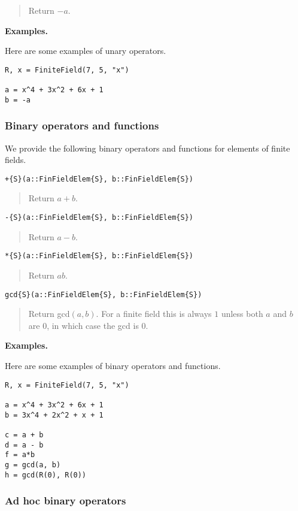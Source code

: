 \documentclass[a4paper,10pt]{article}
\newcommand{\desc}[1]{\vspace{-3mm}\begin{quote}#1\end{quote}}
\begin{document}
{{\desc{Return $-a$.}

\textbf{Examples.}

Here are some examples of unary operators.

\begin{lstlisting}
R, x = FiniteField(7, 5, "x")

a = x^4 + 3x^2 + 6x + 1
b = -a
\end{lstlisting}

\subsubsection{Binary operators and functions}

We provide the following binary operators and functions for elements of
finite fields.

\begin{lstlisting}
+{S}(a::FinFieldElem{S}, b::FinFieldElem{S})
\end{lstlisting}

\desc{Return $a + b$.}

\begin{lstlisting}
-{S}(a::FinFieldElem{S}, b::FinFieldElem{S})
\end{lstlisting}

\desc{Return $a - b$.}

\begin{lstlisting}
*{S}(a::FinFieldElem{S}, b::FinFieldElem{S})
\end{lstlisting}

\desc{Return $ab$.}

\begin{lstlisting}
gcd{S}(a::FinFieldElem{S}, b::FinFieldElem{S})
\end{lstlisting}

\desc{Return gcd$(a, b)$. For a finite field this is always $1$ unless both
$a$ and $b$ are $0$, in which case the gcd is $0$.}

\textbf{Examples.}

Here are some examples of binary operators and functions.

\begin{lstlisting}
R, x = FiniteField(7, 5, "x")

a = x^4 + 3x^2 + 6x + 1
b = 3x^4 + 2x^2 + x + 1

c = a + b
d = a - b
f = a*b
g = gcd(a, b)
h = gcd(R(0), R(0))
\end{lstlisting}

\subsubsection{Ad hoc binary operators}

}}
\end{document}
